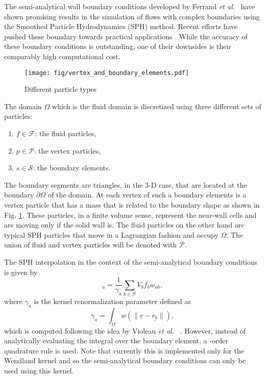 \documentclass[12pt]{memoir}
\newcommand{\uvec}[1]{\underline{#1}}
\newcommand{\etal}{\textit{et al.}~}
\newcommand{\sumP}{\underset{b \in \mathcal{P}}{\sum}}
\begin{document}
The semi-analytical wall boundary conditions developed by Ferrand \etal
\cite{ferrand_unified_2012} have shown promising results in the
simulation of flows with complex boundaries using the Smoothed Particle
Hydrodynamics (SPH) method. Recent efforts have pushed these boundary
towards practical applications \cite{mayrhofer_unified_2014, leroy_unified_2014}.
While the accuracy of these boundary conditions is outstanding, one of
their downsides is their comparably high computational cost.
\begin{figure}[htb]
\centering
\texttt{[image: fig/vertex\_and\_boundary\_elements.pdf]}
\caption{Different particle types}
\label{fig:sa:types}
\end{figure}
The domain $\Omega$ which is the fluid domain is discretized using three different sets of particles:
\begin{enumerate}
\item $f \in \mathcal{F}$: the fluid particles,
\item $p \in \mathcal{P}$: the vertex particles,
\item $s \in \mathcal{S}$: the boundary elements.
\end{enumerate}
The boundary segments are triangles, in the 3-D case, that are located at the boundary $\partial \Omega$ of the domain. At each vertex of such a boundary elements is a vertex particle that has a mass that is related to the boundary shape as shown in Fig. \ref{fig:sa:types}. These particles, in a finite volume sense, represent the near-wall cells and are moving only if the solid wall is. The fluid particles on the other hand are typical SPH particles that move in a Lagrangian fashion and occupy $\Omega$. The union of fluid and vertex particles will be denoted with $\mathcal{P}$.

The SPH interpolation in the context of the semi-analytical boundary conditions is given by
\begin{equation}
[f]_a = \frac{1}{\gamma_a}\sumP V_b f_b w_{ab},
\label{e:sa:int}
\end{equation}
where $\gamma_a$ is the kernel renormalization parameter defined as
\begin{equation}
\gamma_a = \int_\Omega w(\|\uvec{r}-\uvec{r_b}\|),
\label{e:sa:gam}
\end{equation}
which is computed following the idea by Violeau \etal
\cite{violeau_exact_2014}. However, instead of analytically evaluating
the integral over the boundary element, a -order quadrature rule
is used. Note that currently this is implemented only for the Wendland
kernel and so the semi-analytical boundary conditions can only be used
using this kernel.
\end{document}
